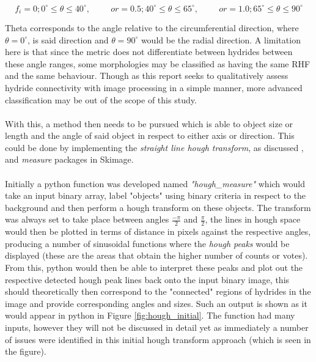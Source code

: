 \documentclass{article}
\begin{document}
    \begin{equation}
        f_i = 0; 0^{\circ} \leq \theta \leq 40^{\circ},\hspace{1cm} or = 0.5;  40^{\circ} \leq \theta \leq 65^{\circ}, \hspace{1cm} or = 1.0; 65^{\circ} \leq \theta \leq 90^{\circ}
    \end{equation}
    
    \noindent Theta corresponds to the angle relative to the circumferential direction, where $\theta = 0^{\circ}$, is said direction and $\theta = 90^{\circ}$ would be the radial direction. A limitation here is that since the metric does not differentiate between hydrides between these angle ranges, some morphologies may be classified as having the same RHF and the same behaviour. Though as this report seeks to qualitatively assess hydride connectivity with image processing in a simple manner, more advanced classification may be out of the scope of this study.
    \\
    \\
    With this, a method then needs to be pursued which is able to object size or length and the angle of said object in respect to either axis or direction. This could be done by implementing the \textit{straight line hough transform}, as discussed \cite{ScikitimageB}, and \textit{measure} packages in Skimage. 
    \\
    \\
    Initially a python function was developed named \textit{"hough\_measure"} which would take an input binary array, label "objects" using binary criteria in respect to the background and then perform a hough transform on these objects. The transform was always set to take place between angles $\frac{-\pi}{2}$ and $\frac{\pi}{2}$, the lines in hough space would then be plotted in terms of distance in pixels against the respective angles, producing a number of sinusoidal functions where the \textit{hough peaks} would be displayed (these are the areas that obtain the higher number of counts or votes). From this, python would then be able to interpret these peaks and plot out the respective detected hough peak lines back onto the input binary image, this should theoretically then correspond to the "connected" regions of hydrides in the image and provide corresponding angles and sizes. Such an output is shown as it would appear in python in Figure \ref{fig:hough_initial}. The function had many inputs, however they will not be discussed in detail yet as immediately a number of issues were identified in this initial hough transform approach (which is seen in the figure).
    
\end{document}
